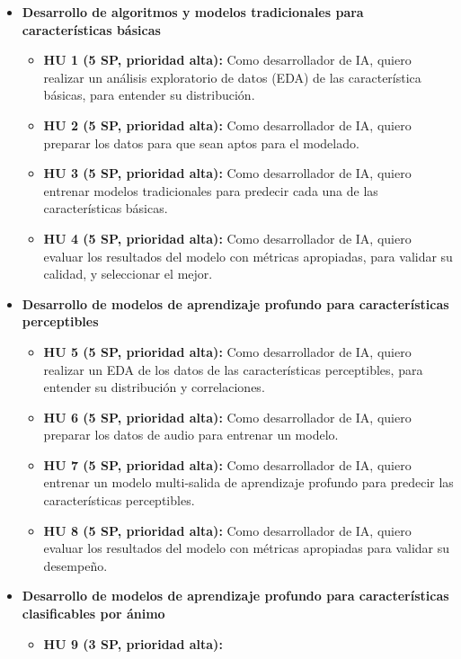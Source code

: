 \documentclass[
11pt, %
]{charter}
\begin{document}
\begin{itemize}
\begin{itemize}
    \end{itemize}
  \item \textbf{Desarrollo de algoritmos y modelos tradicionales para características básicas}
    \begin{itemize}
      \item \textbf{HU 1 (5 SP, prioridad alta):}
      Como desarrollador de IA, quiero realizar un análisis exploratorio de datos (EDA) de las característica básicas, para entender su distribución.
      \item \textbf{HU 2 (5 SP, prioridad alta):}
      Como desarrollador de IA, quiero preparar los datos para que sean aptos para el modelado.
      \item \textbf{HU 3 (5 SP, prioridad alta):}
      Como desarrollador de IA, quiero entrenar modelos tradicionales para predecir cada una de las características básicas.
      \item \textbf{HU 4 (5 SP, prioridad alta):}
      Como desarrollador de IA, quiero evaluar los resultados del modelo con métricas apropiadas, para validar su calidad, y seleccionar el mejor.
    \end{itemize}
  \item \textbf{Desarrollo de modelos de aprendizaje profundo para características perceptibles}
    \begin{itemize}
      \item \textbf{HU 5 (5 SP, prioridad alta):}
      Como desarrollador de IA, quiero realizar un EDA de los datos de las características perceptibles, para entender su distribución y correlaciones.
      \item \textbf{HU 6 (5 SP, prioridad alta):}
      Como desarrollador de IA, quiero preparar los datos de audio para entrenar un modelo.
      \item \textbf{HU 7 (5 SP, prioridad alta):}
      Como desarrollador de IA, quiero entrenar un modelo multi-salida de aprendizaje profundo para predecir las características perceptibles.
      \item \textbf{HU 8 (5 SP, prioridad alta):}
      Como desarrollador de IA, quiero evaluar los resultados del modelo con métricas apropiadas para validar su desempeño.
    \end{itemize}
  \item \textbf{Desarrollo de modelos de aprendizaje profundo para características clasificables por ánimo}
    \begin{itemize}
      \item \textbf{HU 9 (3 SP, prioridad alta):}

\end{itemize}
\end{itemize}
\end{document}
